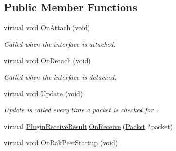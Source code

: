 \subsection*{Public Member Functions}
\begin{DoxyCompactItemize}
\item 
\hypertarget{class_rak_net_1_1_plugin_interface2_a550529f3753c4acf22c3b5c3e203552c}{virtual void \hyperlink{class_rak_net_1_1_plugin_interface2_a550529f3753c4acf22c3b5c3e203552c}{On\-Attach} (void)}\label{class_rak_net_1_1_plugin_interface2_a550529f3753c4acf22c3b5c3e203552c}

\begin{DoxyCompactList}\small\item\em Called when the interface is attached. \end{DoxyCompactList}\item 
\hypertarget{class_rak_net_1_1_plugin_interface2_a73d686ffe9a04a74e5a0ce78422c60f2}{virtual void \hyperlink{class_rak_net_1_1_plugin_interface2_a73d686ffe9a04a74e5a0ce78422c60f2}{On\-Detach} (void)}\label{class_rak_net_1_1_plugin_interface2_a73d686ffe9a04a74e5a0ce78422c60f2}

\begin{DoxyCompactList}\small\item\em Called when the interface is detached. \end{DoxyCompactList}\item 
\hypertarget{class_rak_net_1_1_plugin_interface2_a9587824d39ac045173442dbbc32051da}{virtual void \hyperlink{class_rak_net_1_1_plugin_interface2_a9587824d39ac045173442dbbc32051da}{Update} (void)}\label{class_rak_net_1_1_plugin_interface2_a9587824d39ac045173442dbbc32051da}

\begin{DoxyCompactList}\small\item\em Update is called every time a packet is checked for . \end{DoxyCompactList}\item 
virtual \hyperlink{group___p_l_u_g_i_n___i_n_t_e_r_f_a_c_e___g_r_o_u_p_ga89998adaafb29e5d879113b992161085}{Plugin\-Receive\-Result} \hyperlink{class_rak_net_1_1_plugin_interface2_aa86f33263c1648f11b8a006469272639}{On\-Receive} (\hyperlink{struct_rak_net_1_1_packet}{Packet} $\ast$packet)
\item 
\hypertarget{class_rak_net_1_1_plugin_interface2_a14825e69f0560996327e4dd351842c06}{virtual void \hyperlink{class_rak_net_1_1_plugin_interface2_a14825e69f0560996327e4dd351842c06}{On\-Rak\-Peer\-Startup} (void)}\label{class_rak_net_1_1_plugin_interface2_a14825e69f0560996327e4dd351842c06}


\end{DoxyCompactItemize}
